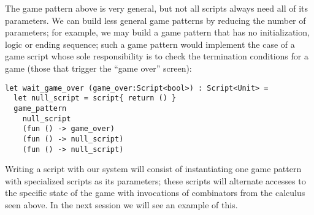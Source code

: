 The game pattern above is very general, but not all scripts always need all of its parameters. We can build less general game patterns by reducing the number of parameters; for example, we may build a game pattern that has no initialization, logic or ending sequence; such a game pattern would implement the case of a game script whose sole responsibility is to check the termination conditions for a game (those that trigger the ``game over'' screen):

\begin{lstlisting}
let wait_game_over (game_over:Script<bool>) : Script<Unit> = 
  let null_script = script{ return () }
  game_pattern 
    null_script
    (fun () -> game_over)
    (fun () -> null_script)
    (fun () -> null_script)
\end{lstlisting}

Writing a script with our system will consist of instantiating one game pattern with specialized scripts as its parameters; these scripts will alternate accesses to the specific state of the game with invocations of combinators from the calculus seen above. In the next session we will see an example of this.
